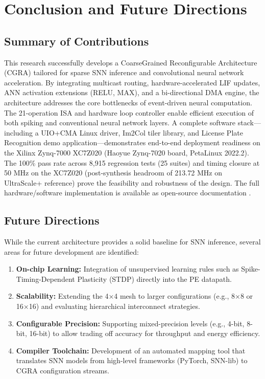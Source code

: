 \section{Conclusion and Future Directions}

\subsection{Summary of Contributions}
{\sloppy
This research successfully develops a Coarse\-Grained Reconfigurable Architecture (CGRA) tailored for sparse SNN inference and convolutional neural network acceleration. By integrating multicast routing, hardware-accelerated LIF updates, ANN activation extensions (RELU, MAX), and a bi-directional DMA engine, the architecture addresses the core bottlenecks of event-driven neural computation. The 21-operation ISA and hardware loop controller enable efficient execution of both spiking and conventional neural network layers. A complete software stack---including a UIO+CMA Linux driver, Im2Col tiler library, and License Plate Recognition demo application---demonstrates end-to-end deployment readiness on the Xilinx Zynq-7000 XC7Z020 (Haoyue Zynq-7020 board, PetaLinux 2022.2). The 100\% pass rate across 8,915 regression tests (25 suites) and timing closure at 50 MHz on the XC7Z020 (post-synthesis headroom of 213.72 MHz on UltraScale+ reference) prove the feasibility and robustness of the design. The full hardware/software implementation is available as open-source documentation \cite{cgra_project_code}.
}

\subsection{Future Directions}
While the current architecture provides a solid baseline for SNN inference, several areas for future development are identified:
\begin{enumerate}
    \item \textbf{On-chip Learning:} Integration of unsupervised learning rules such as Spike-Timing-Dependent Plasticity (STDP) directly into the PE datapath.
    \item \textbf{Scalability:} Extending the 4×4 mesh to larger configurations (e.g., 8×8 or 16×16) and evaluating hierarchical interconnect strategies.
    \item \textbf{Configurable Precision:} Supporting mixed-precision levels (e.g., 4-bit, 8-bit, 16-bit) to allow trading off accuracy for throughput and energy efficiency.
    \item \textbf{Compiler Toolchain:} Development of an automated mapping tool that translates SNN models from high-level frameworks (PyTorch, SNN-lib) to CGRA configuration streams.
\end{enumerate}
